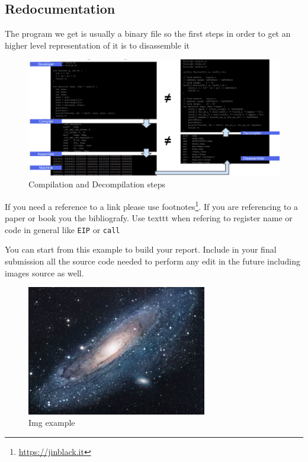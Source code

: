 \documentclass{article}
\begin{document}
\subsection{Redocumentation}
The program we get is usually a binary file so the first steps in order to get an higher level representation of it is to disassemble it 
\begin{figure}[tbh]
    \centering
    \includegraphics[width=1\textwidth]{images/disassembe.png}
    \caption{Compilation and Decompilation steps\citep{SlideReverse}}
    \label{fig:universe}
\end{figure}



If you need a reference to a link please use footnotes\footnote{\url{https://jinblack.it}}. If you are referencing to a paper or book you the bibliografy.
Use texttt when refering to register name or code in general like \texttt{EIP} or \texttt{call}

You can start from this example to build your report. Include in your final submission all the source code needed to perform any edit in the future including images source as well.

\begin{figure}[tbh]
\centering
\includegraphics[width=0.7\textwidth]{images/universe.jpg}
\caption{Img example}
\label{fig:universe}
\end{figure}
\end{document}
